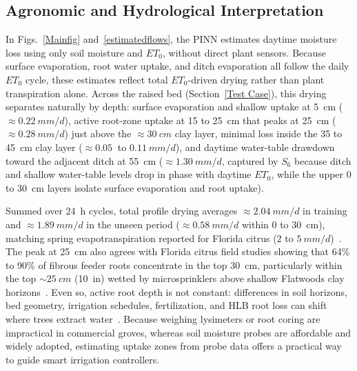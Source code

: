 \documentclass[pdflatex,sn-nature]{sn-jnl}%
\theoremstyle{thmstyleone}%
\theoremstyle{thmstyletwo}%
\theoremstyle{thmstylethree}%
\begin{document}
{\subsection{Agronomic and Hydrological Interpretation}\label{sec:uptake_rationale}

In Figs.~\ref{Mainfig} and~\ref{estimatedflows}, the PINN estimates daytime moisture loss using only soil moisture and $ET_0$, without direct plant sensors. Because surface evaporation, root water uptake, and ditch evaporation all follow the daily $ET_0$ cycle, these estimates reflect total $ET_0$-driven drying rather than plant transpiration alone. Across the raised bed (Section~\ref{Test Case}), this drying separates naturally by depth: surface evaporation and shallow uptake at 5~\si{cm} ($\approx\SI{0.22}{mm/d}$), active root-zone uptake at 15 to 25~\si{cm} that peaks at 25~\si{cm} ($\approx\SI{0.28}{mm/d}$) just above the $\approx\SI{30}{cm}$ clay layer, minimal loss inside the 35 to 45~\si{cm} clay layer ($\approx\SI{0.05}{}$ to $\SI{0.11}{mm/d}$), and daytime water-table drawdown toward the adjacent ditch at 55~\si{cm} ($\approx\SI{1.30}{mm/d}$, captured by $S_6$ because ditch and shallow water-table levels drop in phase with daytime $ET_0$, while the upper 0 to 30~\si{cm} layers isolate surface evaporation and root uptake).

Summed over 24~\si{h} cycles, total profile drying averages $\approx\SI{2.04}{mm/d}$ in training and $\approx\SI{1.89}{mm/d}$ in the unseen period ($\approx\SI{0.58}{mm/d}$ within 0 to 30~\si{cm}), matching spring evapotranspiration reported for Florida citrus ($2$ to $\SI{5}{mm/d}$)~\cite{Morgan2006, Kadyampakeni2014}. The peak at 25~\si{cm} also agrees with Florida citrus field studies showing that 64\% to 90\% of fibrous feeder roots concentrate in the top 30~\si{cm}, particularly within the top $\sim\SI{25}{cm}$ (\SI{10}{in}) wetted by microsprinklers above shallow Flatwoods clay horizons~\cite{Morgan2006, Morgan2007, Castle1993, Kadyampakeni2014, Johnson2023}. Even so, active root depth is not constant: differences in soil horizons, bed geometry, irrigation schedules, fertilization, and HLB root loss can shift where trees extract water~\cite{Kadyampakeni2014, Kwakye2023, Johnson2023}. Because weighing lysimeters or root coring are impractical in commercial groves, whereas soil moisture probes are affordable and widely adopted, estimating uptake zones from probe data offers a practical way to guide smart irrigation controllers.

}
\end{document}
